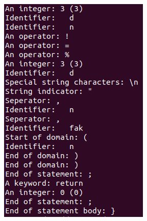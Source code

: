 \begin{multicols}{2}
\begin{figure}
    \label{fig:flex}
\end{figure}
\begin{figure}
    \includegraphics[width=\linewidth]{bilder/flex3.png}
    \label{fig:flex}
\end{figure}

\end{multicols}

